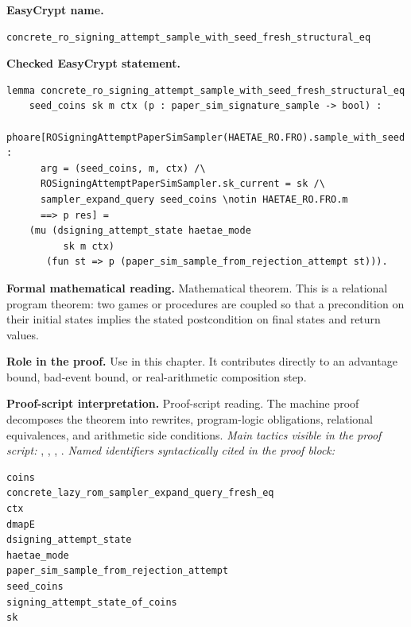 \begin{formaltheorem}
\noindent\textbf{EasyCrypt name.}
\begin{lstlisting}[language=EasyCrypt,basicstyle=\ttfamily\scriptsize]
concrete_ro_signing_attempt_sample_with_seed_fresh_structural_eq
\end{lstlisting}
\noindent\textbf{Checked EasyCrypt statement.}
\begin{lstlisting}[language=EasyCrypt,basicstyle=\ttfamily\scriptsize]
lemma concrete_ro_signing_attempt_sample_with_seed_fresh_structural_eq
    seed_coins sk m ctx (p : paper_sim_signature_sample -> bool) :
  phoare[ROSigningAttemptPaperSimSampler(HAETAE_RO.FRO).sample_with_seed :
      arg = (seed_coins, m, ctx) /\
      ROSigningAttemptPaperSimSampler.sk_current = sk /\
      sampler_expand_query seed_coins \notin HAETAE_RO.FRO.m
      ==> p res] =
    (mu (dsigning_attempt_state haetae_mode
          sk m ctx)
       (fun st => p (paper_sim_sample_from_rejection_attempt st))).
\end{lstlisting}
\noindent\textbf{Formal mathematical reading.}
Mathematical theorem. This is a relational program theorem: two games or procedures are coupled so that a precondition on their initial states implies the stated postcondition on final states and return values.

\noindent\textbf{Role in the proof.}
Use in this chapter. It contributes directly to an advantage bound, bad-event bound, or real-arithmetic composition step.

\noindent\textbf{Proof-script interpretation.}
Proof-script reading. The machine proof decomposes the theorem into rewrites, program-logic obligations, relational equivalences, and arithmetic side conditions.
\emph{Main tactics visible in the proof script:} , , , .
\emph{Named identifiers syntactically cited in the proof block:}
\begin{lstlisting}[language=EasyCrypt,basicstyle=\ttfamily\scriptsize]
coins
concrete_lazy_rom_sampler_expand_query_fresh_eq
ctx
dmapE
dsigning_attempt_state
haetae_mode
paper_sim_sample_from_rejection_attempt
seed_coins
signing_attempt_state_of_coins
sk
\end{lstlisting}

\end{formaltheorem}

